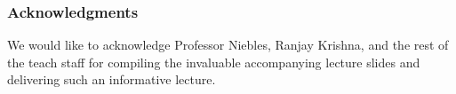 \documentclass{article}
\begin{document}
\subsubsection*{Acknowledgments}
We would like to acknowledge Professor Niebles, Ranjay Krishna, and the rest of the teach staff for compiling the invaluable accompanying lecture slides and delivering such an informative lecture.


\small
%

%
\end{document}
